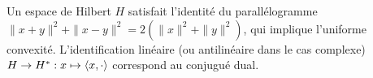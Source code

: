 
%
%

\begin{remark}
\label{rem:unifCvxHilbert}
%
Un espace de Hilbert $H$ satisfait l'identité du parallélogramme $\|x+y\|^2 + \|x-y\|^2 = 2(\|x\|^2+\|y\|^2)$, qui implique l'uniforme convexité. L'identification linéaire (ou antilinéaire dans le cas complexe) $H \to H^* : x \mapsto \langle x,\cdot\rangle$ correspond au conjugué dual.
\end{remark}


